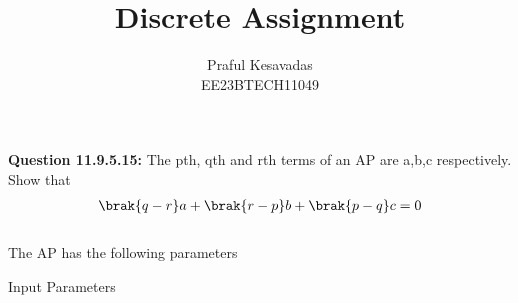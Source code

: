 \documentclass[journal,12pt,onecolumn]{IEEEtran}
\theoremstyle{remark}
\begin{document}
\let\vec\mathbf







\bigskip

\renewcommand{\thefigure}{\theenumi}
\renewcommand{\thetable}{\theenumi}


\title{Discrete Assignment}
\author{Praful Kesavadas\\ EE23BTECH11049}
\maketitle
\textbf{Question 11.9.5.15:}
The pth, qth and rth terms of an AP are a,b,c respectively. Show that
\begin{align*} \brak{q-r}a + \brak{r-p}b +\brak{p-q}c =0 \end{align*}
\solution\\
\fi
The AP has the following parameters
\begin{table}[ht!]
    \centering
    
    \caption{Input Parameters}
\end{table}
\end{document}
